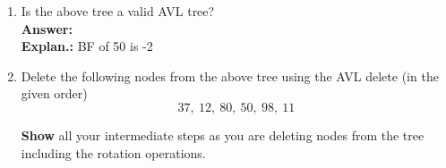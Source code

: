 \documentclass[12pt, a4paper]{article}
\begin{document}
\begin{enumerate}
\begin{enumerate}
      \item Is the above tree a valid AVL tree? \\
      \hspace*{\fill} \textbf{Answer:}  \\
      \hspace*{\fill} \textbf{Explan.:} BF of 50 is -2
      
      \item Delete the following nodes from the above tree using the AVL
      delete (in the given order)
      \begin{equation*}
        37,\ 12,\ 80,\ 50,\ 98,\ 11
      \end{equation*}

      \textbf{Show} all your intermediate steps as you are deleting nodes from
      the tree including the rotation operations.


\end{enumerate}
\end{enumerate}
\end{document}
